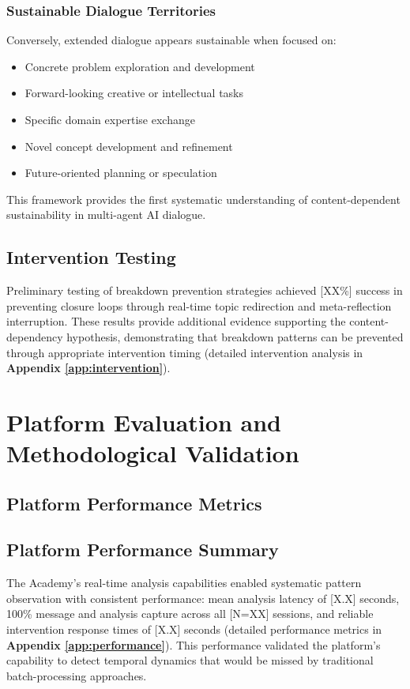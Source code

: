\documentclass[11pt,letterpaper]{article}
\newcommand{\theacademy}{The Academy}
\newcommand{\totalSessions}{[N=XX]} %
\newcommand{\interventionSuccessRate}{[XX\%]} %
\begin{document}
\subsubsection{Sustainable Dialogue Territories}
Conversely, extended dialogue appears sustainable when focused on:
\begin{itemize}
    \item Concrete problem exploration and development
    \item Forward-looking creative or intellectual tasks
    \item Specific domain expertise exchange
    \item Novel concept development and refinement
    \item Future-oriented planning or speculation
\end{itemize}

This framework provides the first systematic understanding of content-dependent sustainability in multi-agent AI dialogue.

\subsection{Intervention Testing}

Preliminary testing of breakdown prevention strategies achieved \interventionSuccessRate{} success in preventing closure loops through real-time topic redirection and meta-reflection interruption. These results provide additional evidence supporting the content-dependency hypothesis, demonstrating that breakdown patterns can be prevented through appropriate intervention timing (detailed intervention analysis in \textbf{Appendix \ref{app:intervention}}).

\section{Platform Evaluation and Methodological Validation}

\subsection{Platform Performance Metrics}

\subsection{Platform Performance Summary}

\theacademy{}'s real-time analysis capabilities enabled systematic pattern observation with consistent performance: mean analysis latency of [X.X] seconds, 100\% message and analysis capture across all \totalSessions{} sessions, and reliable intervention response times of [X.X] seconds (detailed performance metrics in \textbf{Appendix \ref{app:performance}}). This performance validated the platform's capability to detect temporal dynamics that would be missed by traditional batch-processing approaches.
\end{document}
